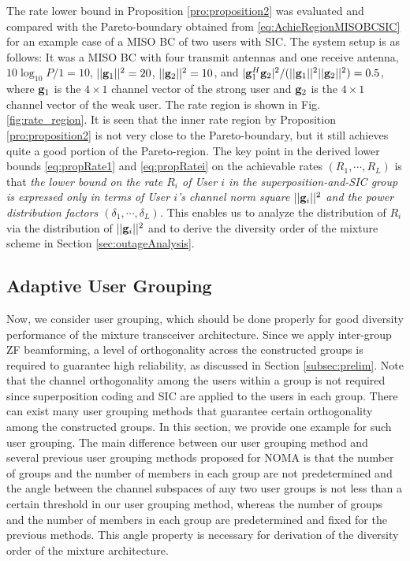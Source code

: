 \documentclass[11pt, draft, onecolumn ]{IEEEtran}
\begin{document}
{The rate lower  bound in Proposition \ref{pro:proposition2} was evaluated and compared with the Pareto-boundary obtained from \eqref{eq:AchieRegionMISOBCSIC} for an example case of a  MISO BC of two users with SIC. The system setup is as follows: It was a MISO BC with four transmit antennas and one receive antenna, $10 \log_{10} P/1 = 10$, $||{\bf g}_1||^2 = 20$, $||{\bf g}_2||^2 = 10$, and $|{\bf g}_1^H {\bf g}_2|^2/(||{\bf g}_1||^2 ||{\bf g}_2||^2) = 0.5$, where ${\bf g}_1$ is the $4 \times 1$ channel vector of the strong user and ${\bf g}_2$ is the $4\times 1$ channel vector of the weak user.
The rate region is shown in Fig. \ref{fig:rate_region}. It is seen that the inner rate region by  Proposition \ref{pro:proposition2} is not very close to the Pareto-boundary, but it still achieves quite a good portion of the Pareto-region.}
The key point in the derived lower bounds \eqref{eq:propRate1} and
 \eqref{eq:propRatei}  on the achievable rates $(R_1,\cdots,R_L)$  is that {\em the lower bound on the rate $R_i$ of User $i$ in the superposition-and-SIC group is expressed only in terms of User $i$'s channel norm square $||{\bf g}_i||^2$ and the power distribution factors $(\delta_1,\cdots,\delta_L)$.} This enables us to analyze the distribution of $R_i$ via the distribution of $||{\bf g}_i||^2$ and to derive the diversity order of the mixture scheme in Section  \ref{sec:outageAnalysis}.



\subsection{Adaptive User Grouping}
\label{sec:User Grouping Algorithm}



Now, we  consider  user grouping, which should be  done properly for good diversity performance of the mixture transceiver architecture.
Since we apply inter-group ZF beamforming, a level of orthogonality across the constructed groups is required to guarantee high reliability, as discussed in Section \ref{subsec:prelim}.  Note that the  channel orthogonality among the users within a group is not required since  superposition coding and SIC are applied to the users in each group.
There can exist many user grouping methods that guarantee certain orthogonality among the constructed groups. In this section, we provide one example for such user grouping.  {}{The main difference between our user grouping method and several previous user grouping methods proposed for NOMA\cite{Chen&Ding&Dai:16Access,Seo&Sung:18SP,AliHossainKim17Access} is that the number of groups and the number of members in each group are not predetermined and the  angle between the channel subspaces of any two user groups is not less than a certain threshold in our user grouping method, whereas the number of groups and the number of members in each group are predetermined and fixed for the previous methods\cite{Chen&Ding&Dai:16Access,Seo&Sung:18SP,AliHossainKim17Access}. This angle property is necessary for derivation of the diversity order of the mixture architecture.
}
\end{document}
